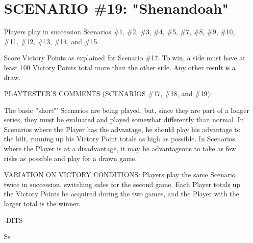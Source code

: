 \section{SCENARIO \#19: "Shenandoah"
}


Players play in succession Scenarios \#1, \#2, \#3, \#4, \#5, \#7, \#8, \#9, \#10, \#11, \#12, \#13, \#14, and \#15.

Score Victory Points as explained for Scenario \#17. To win, a side must have at least 100 Victory Points total more than the other side. Any other result is a draw.

\begin{scenariodata}
PLAYTESTER'S COMMENTS (SCENARIOS \#17, \#18, and \#19):\\
\end{scenariodata}

The basic ''short"' Scenarios are being played, but, since they are part of a longer series, they must be evaluated and played somewhat differently than normal. In Scenarios where the Player has the advantage, he should play his advantage to the hilt, running up his Victory Point totals as high as possible. In Scenarios where the Player is at a disadvantage, it may be advantageous to take as few risks as possible and play for a drawn game.

VARIATION ON VICTORY CONDITIONS: Players play the same Scenario twice in succession, switching sides for the second game. Each Player totals up the Victory Points he acquired during the two games, and the Player with the larger total is the winner.

-DITS

Ss


